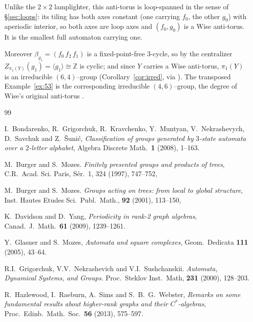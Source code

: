 \documentclass[11pt,reqno]{amsart}
\theoremstyle{plain}
\theoremstyle{definition}
\newcommand{\ZZ}{\mathbb{Z}}
\begin{document}
Unlike the $2\times2$ lamplighter, this anti-torus is loop-spanned in the sense of
\S\ref{sec:loops}: its tiling has both axes constant (one carrying $f_0$, the other $g_0$) with
aperiodic interior, so both axes are loop axes and $(f_0,g_0)$ is a Wise anti-torus.
It is the smallest full automaton carrying one.

Moreover $\beta_{g_1}=(f_0\,f_2\,f_1)$ is a fixed-point-free $3$-cycle, so by
\cite[Lemma~3]{Rat} the centralizer $Z_{\pi_1(Y)}(g_1)=\langle g_1\rangle\cong\ZZ$
is cyclic; and since $Y$ carries a Wise anti-torus, $\pi_1(Y)$ is an irreducible
$(6,4)$--group (Corollary~\ref{cor:irred}, via \cite[Proposition~9]{Rat}). The
transposed Example~\ref{ex:53} is the corresponding irreducible $(4,6)$--group, the
degree of Wise's original anti-torus \cite{W}.

\begin{thebibliography}{99}

I.~Bondarenko, R.~Grigorchuk, R.~Kravchenko, Y.~Muntyan, V.~Nekrashevych,
D.~Savchuk and Z.~\v Suni\'c, \emph{Classification of groups generated by $3$-state
automata over a $2$-letter alphabet}, Algebra Discrete Math.\ \textbf{1} (2008),
1--163.

 M.\ Burger and S.\ Mozes. \emph{Finitely presented groups and products of trees}, C.R.\ Acad. Sci. Paris, S\'er.\ 1, 324 (1997), 747--752, 

 M.\ Burger and S.\ Mozes. \emph{Groups acting on trees: from local to global structure}, Inst.
Hautes Etudes Sci.\ Publ.\ Math.,
\textbf{92} (2001), 113--150, 


K.~Davidson and D.~Yang, \emph{Periodicity in rank-2 graph algebras},
Canad.\ J.\ Math.\ \textbf{61} (2009), 1239--1261.

Y.~Glasner and S.~Mozes, \emph{Automata and square complexes},
Geom.\ Dedicata \textbf{111} (2005), 43--64.


 R.I.\ Grigorchuk, V.V.\ Nekrashevich and V.I.\ Sushchanskii. \emph{Automata, Dynamical Systems, and Groups.} Proc.\ Steklov Inst.\ Math, \textbf{231} (2000), 128--203.

R.~Hazlewood, I.~Raeburn, A.~Sims and S.~B.~G.~Webster, \emph{Remarks on some
fundamental results about higher-rank graphs and their $C^*$-algebras},
Proc.\ Edinb.\ Math.\ Soc.\ \textbf{56} (2013), 575--597.


\end{thebibliography}
\end{document}
